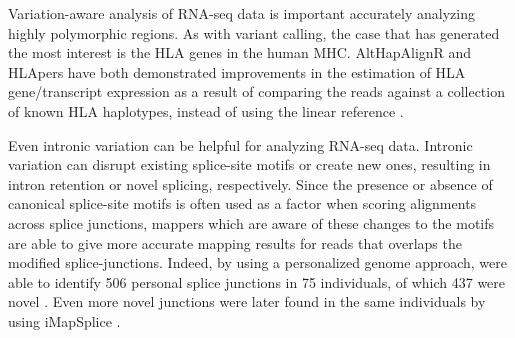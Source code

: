 
%

Variation-aware analysis of RNA-seq data is important accurately analyzing highly polymorphic regions.
As with variant calling, the case that has generated the most interest is the HLA genes in the human MHC. 
AltHapAlignR and HLApers have both demonstrated improvements in the estimation of HLA gene/transcript expression as a result of comparing the reads against a collection of known HLA haplotypes, instead of using the linear reference \cite{Lee_2018,Aguiar2019-fy}.

Even intronic variation can be helpful for analyzing RNA-seq data. 
Intronic variation can disrupt existing splice-site motifs or create new ones, resulting in intron retention or novel splicing, respectively. 
Since the presence or absence of canonical splice-site motifs is often used as a factor when scoring alignments across splice junctions, mappers which are aware of these changes to the motifs are able to give more accurate mapping results for reads that overlaps the modified splice-junctions. 
Indeed, by using a personalized genome approach, \citeauthor{Stein_2015} were able to identify 506 personal splice junctions in 75 individuals, of which 437 were novel \cite{Stein_2015}.
Even more novel junctions were later found in the same individuals by \citeauthor{Liu_2018} using iMapSplice \cite{Liu_2018}.

